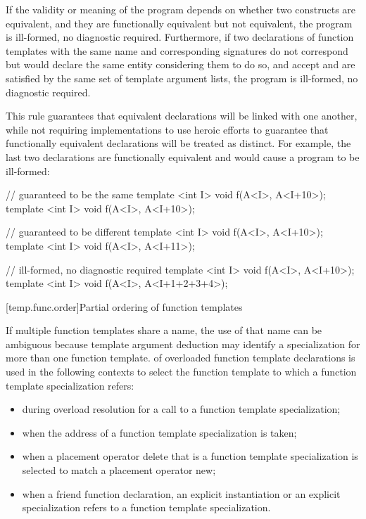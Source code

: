 \pnum
If the validity or meaning of the program depends on
whether two constructs are equivalent, and they are
functionally equivalent but not equivalent, the program is ill-formed,
no diagnostic required.
Furthermore, if two declarations of function templates with the same name
and corresponding signatures do not correspond
but would declare the same entity considering them to do so, and
accept and are satisfied by the same set of template argument lists,
the program is ill-formed, no diagnostic required.

\pnum
\begin{note}
This rule guarantees that equivalent declarations will be linked with
one another, while not requiring implementations to use heroic efforts
to guarantee that functionally equivalent declarations will be treated
as distinct.
For example, the last two declarations are functionally
equivalent and would cause a program to be ill-formed:

\begin{codeblock}
// guaranteed to be the same
template <int I> void f(A<I>, A<I+10>);
template <int I> void f(A<I>, A<I+10>);

// guaranteed to be different
template <int I> void f(A<I>, A<I+10>);
template <int I> void f(A<I>, A<I+11>);

// ill-formed, no diagnostic required
template <int I> void f(A<I>, A<I+10>);
template <int I> void f(A<I>, A<I+1+2+3+4>);
\end{codeblock}
\end{note}

[temp.func.order]{Partial ordering of function templates}

\pnum
{}%
%
If multiple function templates share a name,
the use of that name can be ambiguous because
template argument deduction may identify
a specialization for more than one function template.
of overloaded function template declarations is used in the following contexts
to select the function template to which a function template specialization
refers:
\begin{itemize}
\item
during overload resolution for a call to a function template specialization;
\item
when the address of a function template specialization is taken;
\item
when a placement operator delete that is a
function template
specialization
is selected to match a placement operator new;
\item
when a friend function declaration, an
explicit instantiation or an explicit specialization refers to
a function template specialization.
\end{itemize}

